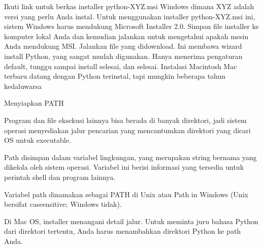 \noindent 
{\fontsize{14pt}{14pt}\selectfont \vspace{\baselineskip}
Ikuti link untuk berkas installer python-XYZ.msi Windows dimana XYZ adalah versi yang perlu Anda instal. Untuk menggunakan installer python-XYZ.msi ini, sistem Windows harus mendukung Microsoft Installer 2.0. Simpan file installer ke komputer lokal Anda dan kemudian jalankan untuk mengetahui apakah mesin Anda mendukung MSI. Jalankan file yang didownload. Ini membawa wizard install Python, yang sangat mudah digunakan. Hanya menerima pengaturan default, tunggu sampai install selesai, dan selesai. Instalasi Macintosh Mac terbaru datang dengan Python terinstal, tapi mungkin beberapa tahun kedaluwarsa \\} \par
\noindent 
{\fontsize{14pt}{14pt}\selectfont Menyiapkan PATH \\} \par
\noindent 
{\fontsize{14pt}{14pt}\selectfont Program dan file eksekusi lainnya bisa berada di banyak direktori, jadi sistem operasi menyediakan jalur pencarian yang mencantumkan direktori yang dicari OS untuk executable. \\} \par
\vspace{14pt}
\noindent 
{\fontsize{14pt}{14pt}\selectfont Path disimpan dalam variabel lingkungan, yang merupakan string bernama yang dikelola oleh sistem operasi. Variabel ini berisi informasi yang tersedia untuk perintah shell dan program lainnya. \\} \par
\vspace{14pt}
\noindent 
{\fontsize{14pt}{14pt}\selectfont Variabel path dinamakan sebagai PATH di Unix atau Path in Windows (Unix bersifat caseensitive; Windows tidak). \\} \par
\vspace{14pt}
\noindent 
{\fontsize{14pt}{14pt}\selectfont Di Mac OS, installer menangani detail jalur. Untuk meminta juru bahasa Python dari direktori tertentu, Anda harus menambahkan direktori Python ke path Anda. \\} \par
\vspace{14pt}
\noindent 
